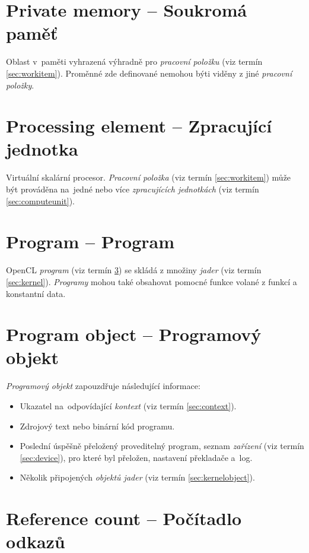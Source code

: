 \section{Private memory -- Soukromá paměť}
\label{sec:privatememory}

Oblast v~paměti vyhrazená výhradně pro \emph{pracovní položku} (viz termín \ref{sec:workitem}). Proměnné
zde definované nemohou býti viděny z jiné \emph{pracovní položky}.

\section{Processing element  -- Zpracující jednotka}
\label{sec:processingelement}

Virtuální skalární procesor. \emph{Pracovní položka} (viz termín \ref{sec:workitem}) může být prováděna na~jedné
nebo více \emph{zpracujících jednotkách} (viz termín \ref{sec:computeunit}).

\section{Program -- Program}
\label{sec:program}

OpenCL \emph{program} (viz termín \ref{sec:program}) se skládá z množiny \emph{jader} (viz termín \ref{sec:kernel}). \emph{Programy} mohou
také obsahovat pomocné funkce volané z  funkcí  a
konstantní data.

\section{Program object -- Programový objekt}
\label{sec:programobject}

\emph{Programový objekt} zapouzdřuje následující informace:

\begin{itemize}
\item Ukazatel na~odpovídající \emph{kontext} (viz termín \ref{sec:context}).
\item Zdrojový text nebo binární kód programu.
\item Poslední úspěšně přeložený proveditelný program, seznam \emph{zařízení} (viz termín \ref{sec:device}),
pro které byl přeložen, nastavení překladače a~log.
\item Několik připojených \emph{objektů jader} (viz termín \ref{sec:kernelobject}).
\end{itemize}

\section{Reference count -- Počítadlo odkazů}
\label{sec:referencecount}

